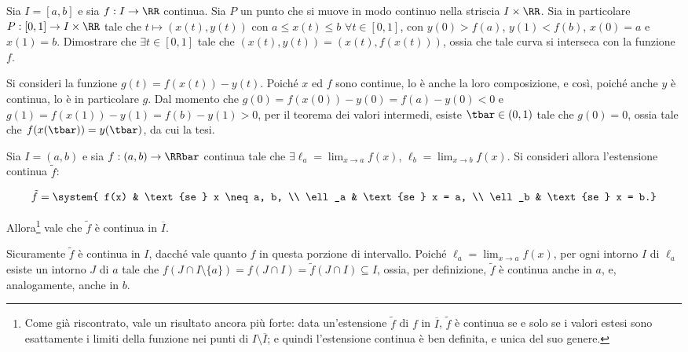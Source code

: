 \documentclass[11pt]{article}
\begin{document}
	\begin{exercise}
		Sia $I = [a, b]$ e sia $f: I \to \RR$ continua. Sia $P$ un punto che si muove in modo continuo nella striscia $I \times \RR$. Sia in
		particolare $P : [0, 1] \to I \times \RR$ tale che
		$t \mapsto (x(t), y(t))$ con $a \leq x(t) \leq b$ $\forall t \in [0, 1]$, con $y(0) > f(a)$, $y(1) < f(b)$, $x(0) = a$ e $x(1) = b$. Dimostrare che $\exists t \in
		[0, 1]$ tale che $(x(t), y(t)) = (x(t), f(x(t)))$, ossia che tale
		curva si interseca con la funzione $f$.
	\end{exercise}

	\begin{solution}
		Si consideri la funzione $g(t) = f(x(t)) - y(t)$. Poiché $x$ ed
		$f$ sono continue, lo è anche la loro composizione, e così,
		poiché anche $y$ è continua, lo è in particolare $g$. Dal momento
		che $g(0) = f(x(0)) - y(0) = f(a) - y(0) < 0$ e $g(1) =
		f(x(1)) - y(1) = f(b) - y(1) > 0$, per il teorema dei valori
		intermedi, esiste $\tbar \in (0, 1)$ tale che $g(0) = 0$,
		ossia tale che $f(x(\tbar)) = y(\tbar)$, da cui la tesi.
	\end{solution}
	
	\begin{exercise}
		Sia $I = (a, b)$ e sia $f : (a, b) \to \RRbar$ continua tale che
		$\exists \ell_a = \lim_{x \to a} f(x)$, $\ell_b = \lim_{x \to b} f(x)$.
		Si consideri allora l'estensione continua $\tilde f$:
		
		\[ \tilde f = \system{ f(x) & \text{se } x \neq a, b, \\ \ell_a & \text{se } x = a, \\ \ell_b & \text{se } x = b.} \]
		
		Allora\footnote{Come
			già riscontrato, vale un risultato ancora più forte:
			data un'estensione $\tilde f$ di $f$ in $\overline I$, $\tilde f$
			è continua se e solo se i valori estesi sono esattamente i limiti
			della funzione nei punti di $I \setminus \overline I$; e quindi
			l'estensione continua è ben definita, e unica del suo genere.} vale che $\tilde f$ è continua in $\overline I$.
	\end{exercise}

	\begin{solution}
		Sicuramente $\tilde f$ è continua in $I$, dacché vale quanto
		$f$ in questa porzione di intervallo. Poiché $\ell_a = \lim_{x \to a} f(x)$, per ogni intorno $I$ di $\ell_a$ esiste un intorno $J$ di $a$
		tale che $f(J \cap I \setminus \{a\}) = f(J \cap I) = \tilde f(J \cap I) \subseteq I$, ossia, per definizione, $\tilde f$ è continua
		anche in $a$, e, analogamente, anche in $b$.
	\end{solution}
\end{document}
